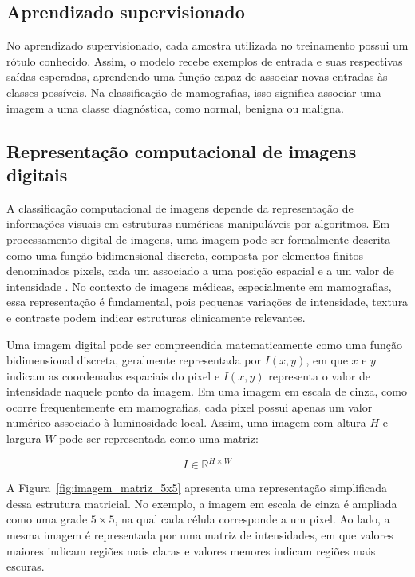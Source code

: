 \documentclass[
    12pt,
    openright,
    oneside,
    a4paper,
    english,
    brazil
]{abntex2}
\begin{document}
\subsection{Aprendizado supervisionado}

No aprendizado supervisionado, cada amostra utilizada no treinamento possui um rótulo conhecido. Assim, o modelo recebe exemplos de entrada e suas respectivas saídas esperadas, aprendendo uma função capaz de associar novas entradas às classes possíveis. Na classificação de mamografias, isso significa associar uma imagem a uma classe diagnóstica, como normal, benigna ou maligna.

\subsection{Representação computacional de imagens digitais}

A classificação computacional de imagens depende da representação de informações visuais em estruturas numéricas manipuláveis por algoritmos. Em processamento digital de imagens, uma imagem pode ser formalmente descrita como uma função bidimensional discreta, composta por elementos finitos denominados pixels, cada um associado a uma posição espacial e a um valor de intensidade \cite{gonzalez2008digital}. No contexto de imagens médicas, especialmente em mamografias, essa representação é fundamental, pois pequenas variações de intensidade, textura e contraste podem indicar estruturas clinicamente relevantes.

Uma imagem digital pode ser compreendida matematicamente como uma função bidimensional discreta, geralmente representada por \(I(x,y)\), em que \(x\) e \(y\) indicam as coordenadas espaciais do pixel e \(I(x,y)\) representa o valor de intensidade naquele ponto da imagem. Em uma imagem em escala de cinza, como ocorre frequentemente em mamografias, cada pixel possui apenas um valor numérico associado à luminosidade local. Assim, uma imagem com altura \(H\) e largura \(W\) pode ser representada como uma matriz:

\[
I \in \mathbb{R}^{H \times W}
\]

A Figura~\ref{fig:imagem_matriz_5x5} apresenta uma representação simplificada dessa estrutura matricial. No exemplo, a imagem em escala de cinza é ampliada como uma grade \(5 \times 5\), na qual cada célula corresponde a um pixel. Ao lado, a mesma imagem é representada por uma matriz de intensidades, em que valores maiores indicam regiões mais claras e valores menores indicam regiões mais escuras.
\end{document}
